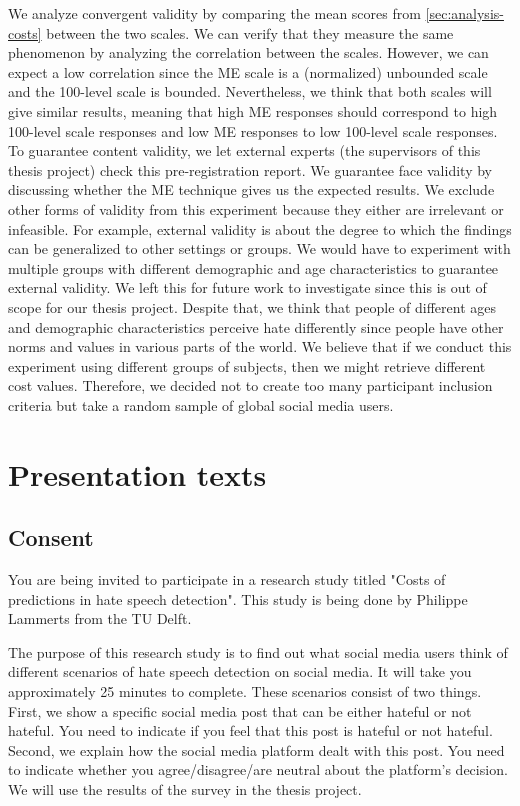 \documentclass[a4paper]{article}
\begin{document}
We analyze convergent validity by comparing the mean scores from \ref{sec:analysis-costs} between the two scales. We can verify that they measure the same phenomenon by analyzing the correlation between the scales. However, we can expect a low correlation since the ME scale is a (normalized) unbounded scale and the 100-level scale is bounded. Nevertheless, we think that both scales will give similar results, meaning that high ME responses should correspond to high 100-level scale responses and low ME responses to low 100-level scale responses. To guarantee content validity, we let external experts (the supervisors of this thesis project) check this pre-registration report. We guarantee face validity by discussing whether the ME technique gives us the expected results. We exclude other forms of validity from this experiment because they either are irrelevant or infeasible. For example, external validity is about the degree to which the findings can be generalized to other settings or groups. We would have to experiment with multiple groups with different demographic and age characteristics to guarantee external validity. We left this for future work to investigate since this is out of scope for our thesis project. Despite that, we think that people of different ages and demographic characteristics perceive hate differently since people have other norms and values in various parts of the world. We believe that if we conduct this experiment using different groups of subjects, then we might retrieve different cost values. Therefore, we decided not to create too many participant inclusion criteria but take a random sample of global social media users.

\appendix
\section{Presentation texts}
\label{sec:appendix}

\subsection{Consent}
You are being invited to participate in a research study titled "Costs of predictions in hate speech detection". This study is being done by Philippe Lammerts from the TU Delft.

The purpose of this research study is to find out what social media users think of different scenarios of hate speech detection on social media. It will take you approximately 25 minutes to complete. These scenarios consist of two things. First, we show a specific social media post that can be either hateful or not hateful. You need to indicate if you feel that this post is hateful or not hateful. Second, we explain how the social media platform dealt with this post. You need to indicate whether you agree/disagree/are neutral about the platform's decision. We will use the results of the survey in the thesis project.
\end{document}
